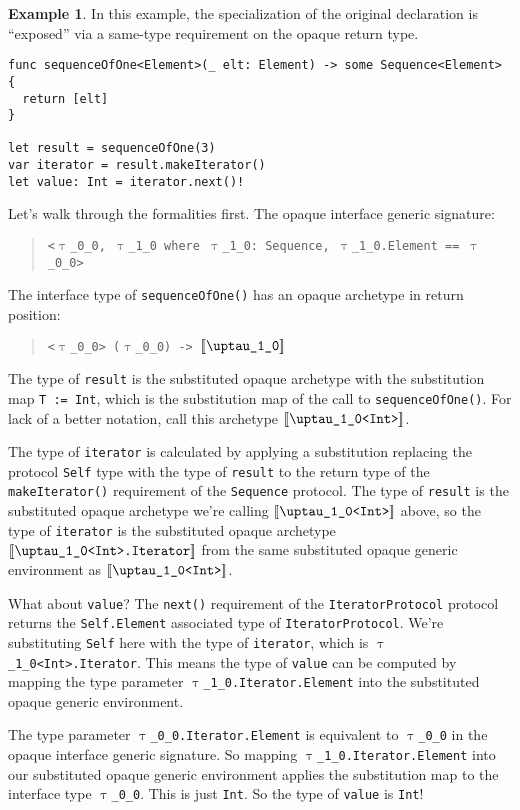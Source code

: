 \documentclass[a4paper,headsepline,bibliography=totoc,toc=flat,fleqn,twoside=semi]{scrbook}
\theoremstyle{definition}
\theoremstyle{definition}
\newtheorem{example}{Example}[chapter]
\theoremstyle{definition}
\newcommand{\ttgp}[2]{\texttt{$\uptau$\_#1\_#2}}
\newcommand{\archetype}[1]{$[\![\texttt{#1}]\!]$}
\begin{document}
\begin{example}
In this example, the specialization of the original declaration is ``exposed'' via a same-type requirement on the opaque return type.
\begin{Verbatim}
func sequenceOfOne<Element>(_ elt: Element) -> some Sequence<Element> {
  return [elt]
}

let result = sequenceOfOne(3)
var iterator = result.makeIterator()
let value: Int = iterator.next()!
\end{Verbatim}
Let's walk through the formalities first. The opaque interface generic signature:
\begin{quote}
\texttt{<\ttgp{0}{0}, \ttgp{1}{0} where \ttgp{1}{0}:\ Sequence, \ttgp{1}{0}.Element == \ttgp{0}{0}>}
\end{quote}
The interface type of \texttt{sequenceOfOne()} has an opaque archetype in return position:
\begin{quote}
\texttt{<\ttgp{0}{0}> (\ttgp{0}{0}) -> \archetype{\ttgp{1}{0}}}
\end{quote}
The type of \texttt{result} is the substituted opaque archetype with the substitution map \texttt{T := Int}, which is the substitution map of the call to \texttt{sequenceOfOne()}. For lack of a better notation, call this archetype \archetype{\ttgp{1}{0}<Int>}.

The type of \texttt{iterator} is calculated by applying a substitution replacing the protocol \texttt{Self} type with the type of \texttt{result} to the return type of the \texttt{makeIterator()} requirement of the \texttt{Sequence} protocol. The type of \texttt{result} is the substituted opaque archetype we're calling \archetype{\ttgp{1}{0}<Int>} above, so the type of \texttt{iterator} is the substituted opaque archetype \archetype{\ttgp{1}{0}<Int>.Iterator} from the same substituted opaque generic environment as \archetype{\ttgp{1}{0}<Int>}.

What about \texttt{value}? The \texttt{next()} requirement of the \texttt{IteratorProtocol} protocol returns the \texttt{Self.Element} associated type of \texttt{IteratorProtocol}. We're substituting \texttt{Self} here with the type of \texttt{iterator}, which is \texttt{\ttgp{1}{0}<Int>.Iterator}. This means the type of \texttt{value} can be computed by mapping the type parameter \texttt{\ttgp{1}{0}.Iterator.Element} into the substituted opaque generic environment.

The type parameter \texttt{\ttgp{0}{0}.Iterator.Element} is equivalent to \texttt{\ttgp{0}{0}} in the opaque interface generic signature. So mapping \texttt{\ttgp{1}{0}.Iterator.Element} into our substituted opaque generic environment applies the substitution map to the interface type \texttt{\ttgp{0}{0}}. This is just \texttt{Int}. So the type of \texttt{value} is \texttt{Int}!
\end{example}
\end{document}
